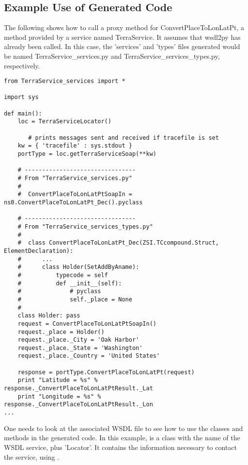 \subsection{Example Use of Generated Code}

The following shows how to call a proxy method for
ConvertPlaceToLonLatPt, a method provided by a service
named TerraService. It assumes that wsdl2py has already been called.
In this case, the 'services' and 'types' files generated would
be named TerraService_services.py and TerraService_services_types.py,
respectively.

\begin{verbatim}
from TerraService_services import *

import sys

def main():
    loc = TerraServiceLocator()

       # prints messages sent and received if tracefile is set
    kw = { 'tracefile' : sys.stdout }
    portType = loc.getTerraServiceSoap(**kw)

    # --------------------------------
    # From "TerraService_services.py"
    #
    #  ConvertPlaceToLonLatPtSoapIn = ns0.ConvertPlaceToLonLatPt_Dec().pyclass

    # --------------------------------
    # From "TerraService_services_types.py"
    #
    #  class ConvertPlaceToLonLatPt_Dec(ZSI.TCcompound.Struct, ElementDeclaration):
    #      ...
    #      class Holder(SetAddByAname):
    #          typecode = self
    #          def __init__(self):
    #              # pyclass
    #              self._place = None
    #
    class Holder: pass
    request = ConvertPlaceToLonLatPtSoapIn()
    request._place = Holder()
    request._place._City = 'Oak Harbor'
    request._place._State = 'Washington'
    request._place._Country = 'United States'

    response = portType.ConvertPlaceToLonLatPt(request)
    print "Latitude = %s" % response._ConvertPlaceToLonLatPtResult._Lat
    print "Longitude = %s" % response._ConvertPlaceToLonLatPtResult._Lon
...

\end{verbatim}

One needs to look at the associated WSDL file to see how
to use the classes and methods in the generated code.
In this example, 
is a class with the name of the WSDL service, plus 'Locator'.  It contains the
information necessary to contact the service, using
.

